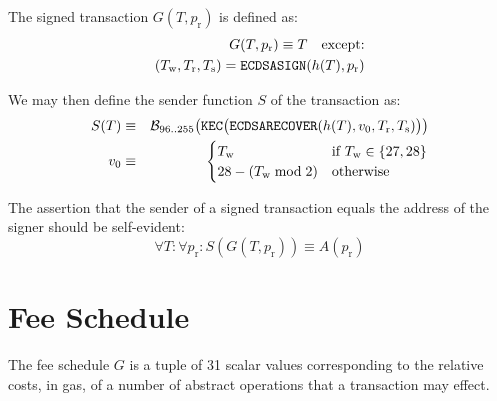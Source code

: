 \documentclass[9pt,oneside]{amsart}
\begin{document}
The signed transaction $G(T, p_{\mathrm{r}})$ is defined as:
\begin{eqnarray}
G(T, p_{\mathrm{r}}) \equiv T \quad \text{except:} \\
(T_{\mathrm{w}}, T_{\mathrm{r}}, T_{\mathrm{s}}) = \mathtt{\small ECDSASIGN}(h(T), p_{\mathrm{r}})
\end{eqnarray}

We may then define the sender function $S$ of the transaction as:
\begin{eqnarray}
S(T) &\equiv& \mathcal{B}_{96..255}\big(\mathtt{\tiny KEC}\big( \mathtt{\small ECDSARECOVER}(h(T), v_0, T_{\mathrm{r}}, T_{\mathrm{s}}) \big) \big) \\
v_0 &\equiv& \begin{cases}
T_{\mathrm{w}} &\text{if}\ T_{\mathrm{w}}\in\{27, 28\} \\
28 - (T_{\mathrm{w}} \bmod 2) &\text{otherwise}
\end{cases}
\end{eqnarray}

The assertion that the sender of a signed transaction equals the address of the signer should be self-evident:
\begin{equation}
\forall T: \forall p_{\mathrm{r}}: S(G(T, p_{\mathrm{r}})) \equiv A(p_{\mathrm{r}})
\end{equation}

\section{Fee Schedule}\label{app:fees}

The fee schedule $G$ is a tuple of 31 scalar values corresponding to the relative costs, in gas, of a number of abstract operations that a transaction may effect.
\end{document}
